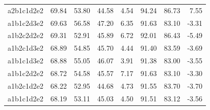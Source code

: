 \begin{table}[p]
\begin{tabular}{lrrrrrrr}
a2b1c1d2e2 & 69.84 & 53.80 & 44.58 & 4.54 & 94.24 & 86.73 & 7.55 \\
a1b1c2d3e2 & 69.63 & 56.58 & 47.20 & 6.35 & 91.63 & 83.10 & -3.31 \\
a1b2c2d2e2 & 69.31 & 52.91 & 45.89 & 6.72 & 92.01 & 86.43 & -5.49 \\
a1b2c1d3e2 & 68.89 & 54.85 & 45.70 & 4.44 & 91.40 & 83.59 & -3.69 \\
a1b1c1d3e2 & 68.88 & 55.05 & 46.07 & 3.91 & 91.38 & 83.00 & -3.55 \\
a1b1c2d2e2 & 68.72 & 54.58 & 45.57 & 7.17 & 91.63 & 83.10 & -3.30 \\
a1b2c1d2e2 & 68.22 & 52.95 & 44.68 & 4.73 & 91.55 & 83.70 & -3.70 \\
a1b1c1d2e2 & 68.19 & 53.11 & 45.03 & 4.50 & 91.51 & 83.12 & -3.56 \\
\bottomrule\end{tabular}\end{table}
